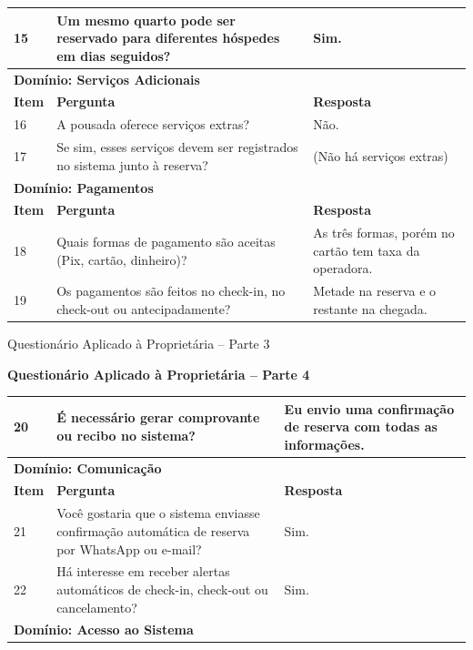 \documentclass[
	12pt,				%
	openany,			%
	oneside,			%
	a4paper,			%
	english,			%
	french,				%
	spanish,			%
	brazil				%
	]{abntex2}
\begin{document}
\begin{apendicesenv}
\begin{quadro}[H]
\begin{tabular}{|p{1cm}|p{6.5cm}|p{6.5cm}|}
		15 & Um mesmo quarto pode ser reservado para diferentes hóspedes em dias seguidos?& Sim. \\
		\hline
		\multicolumn{3}{|l|}{\textbf{Domínio: Serviços Adicionais}} \\ \hline
		\textbf{Item} & \textbf{Pergunta} & \textbf{Resposta} \\
		\hline
		16 &  A pousada oferece serviços extras? & Não. \\ 
		\hline
		17 & Se sim, esses serviços devem ser registrados no sistema junto à reserva? & (Não há serviços extras)\\
		\hline
		\multicolumn{3}{|l|}{\textbf{Domínio: Pagamentos}} \\
		\hline
		\textbf{Item} & \textbf{Pergunta} & \textbf{Resposta} \\ 
		\hline
		18 &  Quais formas de pagamento são aceitas (Pix, cartão, dinheiro)? & As três formas, porém no cartão tem taxa da operadora. \\
		\hline
		19 &  Os pagamentos são feitos no check-in, no check-out ou antecipadamente? & Metade na reserva e o restante na chegada.\\ 
		\hline
	\end{tabular}
\end{quadro}
\begin{quadro}[H]
	\caption{Questionário Aplicado à Proprietária – Parte 3}
	\label{quadro:questionario4}
	\vspace{0.3cm} 
	\textbf\bfseries\large{Questionário Aplicado à Proprietária – Parte 4} \\
	\vspace{0.3cm} 
	\begin{tabular}{|p{1cm}|p{6.5cm}|p{6.5cm}|}
		\hline
		20 &  É necessário gerar comprovante ou recibo no sistema? & Eu envio uma confirmação de reserva com todas as informações.\\ 
		\hline
		\multicolumn{3}{|l|}{\textbf{Domínio: Comunicação}} \\ \hline
		\textbf{Item} & \textbf{Pergunta} & \textbf{Resposta} \\ \hline
		21 & Você gostaria que o sistema enviasse confirmação automática de reserva por WhatsApp ou e-mail? & Sim. \\ \hline
		22 &  Há interesse em receber alertas automáticos de check-in, check-out ou cancelamento? & Sim. \\ \hline
		\multicolumn{3}{|l|}{\textbf{Domínio: Acesso ao Sistema}} \\

\end{tabular}
\end{quadro}
\end{apendicesenv}
\end{document}
